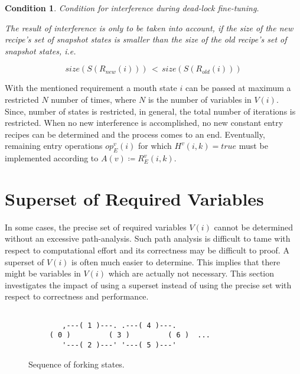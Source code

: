 \documentclass[12pt,a4paper]{scrartcl}
\newtheorem{condition}{Condition}
\begin{document}
\begin{condition}
Condition for interference during dead-lock fine-tuning.

The result of interference is only to be taken into account, if the size of the
new recipe's set of snapshot states is smaller than the size of the old
recipe's set of snapshot states, i.e.

\begin{equation} 
    size(S(R_{new}(i)))\,<\,size(S(R_{old}(i)))
\end{equation}

\end{condition}

With the mentioned requirement a mouth state $i$ can be passed at maximum a
restricted $N$ number of times, where $N$ is the number of variables in $V(i)$.
Since, number of states is restricted, in general, the total number of
iterations is restricted. When no new interference is accomplished, no new
constant entry recipes can be determined and the process comes to an end.
Eventually, remaining entry operations $op_E^v(i)$ for which $H^v(i,k)=true$
must be implemented according to $A(v) \coloneqq  R_E^v(i,k)$.

\section{Superset of Required Variables}

In some cases, the precise set of required variables $V(i)$ cannot be
determined without an excessive path-analysis. Such path analysis is difficult
to tame with respect to computational effort and its correctness may be
difficult to proof.  A superset of $V(i)$ is often much easier to determine.
This implies that there might be variables in $V(i)$ which are actually not
necessary. This section investigates the impact of using a superset instead
of using the precise set with respect to correctness and performance. 

\begin{figure}[htbp] \leavevmode \label{fig:fork-states}
\begin{verbatim}
         
        ,---( 1 )---. .---( 4 )---.       
     ( 0 )         ( 3 )         ( 6 )  ...
        '---( 2 )---' '---( 5 )---'

\end{verbatim}
\caption{Sequence of forking states.}
\end{figure}
\end{document}
